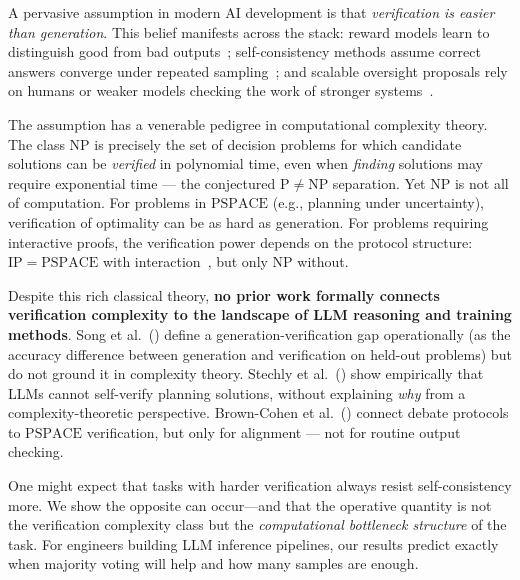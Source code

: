 \documentclass{article}
\theoremstyle{definition}
\theoremstyle{remark}
\newcommand{\PTIME}{\mathrm{P}}
\newcommand{\NP}{\mathrm{NP}}
\newcommand{\PSPACE}{\mathrm{PSPACE}}
\newcommand{\IP}{\mathrm{IP}}
\begin{document}
A pervasive assumption in modern AI development is that \emph{verification is easier than generation}.
This belief manifests across the stack: reward models learn to distinguish good from bad outputs~\citep{christiano2017deep,ouyang2022training}; self-consistency methods assume correct answers converge under repeated sampling~\citep{wang2023selfconsistency}; and scalable oversight proposals rely on humans or weaker models checking the work of stronger systems~\citep{burns2023weak,irving2018debate}.

The assumption has a venerable pedigree in computational complexity theory.
The class $\NP$ is precisely the set of decision problems for which candidate solutions can be \emph{verified} in polynomial time, even when \emph{finding} solutions may require exponential time --- the conjectured $\PTIME \neq \NP$ separation.
Yet $\NP$ is not all of computation.
For problems in $\PSPACE$ (e.g., planning under uncertainty), verification of optimality can be as hard as generation.
For problems requiring interactive proofs, the verification power depends on the protocol structure: $\IP = \PSPACE$ with interaction~\citep{shamir1992ip}, but only $\NP$ without.

Despite this rich classical theory, \textbf{no prior work formally connects verification complexity to the landscape of LLM reasoning and training methods}.
Song et al.~(\citeyear{song2024mind}) define a generation-verification gap operationally (as the accuracy difference between generation and verification on held-out problems) but do not ground it in complexity theory.
Stechly et al.~(\citeyear{stechly2024self}) show empirically that LLMs cannot self-verify planning solutions, without explaining \emph{why} from a complexity-theoretic perspective.
Brown-Cohen et al.~(\citeyear{browncohen2024debate}) connect debate protocols to $\PSPACE$ verification, but only for alignment --- not for routine output checking.

One might expect that tasks with harder verification always resist self-consistency more.
We show the opposite can occur---and that the operative quantity is not the verification complexity class but the \emph{computational bottleneck structure} of the task.
For engineers building LLM inference pipelines, our results predict exactly when majority voting will help and how many samples are enough.
\end{document}
